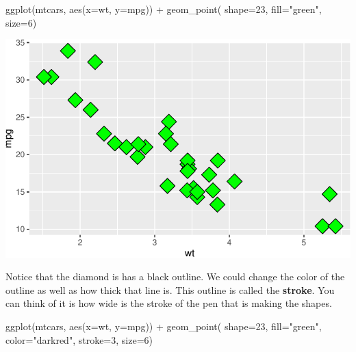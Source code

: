 \documentclass[
  letterpaper,
  DIV=11,
  numbers=noendperiod]{scrreprt}
\newenvironment{Shaded}{\begin{snugshade}}{\end{snugshade}}
\newcommand{\AttributeTok}[1]{\textcolor[rgb]{0.40,0.45,0.13}{#1}}
\newcommand{\DecValTok}[1]{\textcolor[rgb]{0.68,0.00,0.00}{#1}}
\newcommand{\FunctionTok}[1]{\textcolor[rgb]{0.28,0.35,0.67}{#1}}
\newcommand{\NormalTok}[1]{\textcolor[rgb]{0.00,0.23,0.31}{#1}}
\newcommand{\SpecialCharTok}[1]{\textcolor[rgb]{0.37,0.37,0.37}{#1}}
\newcommand{\StringTok}[1]{\textcolor[rgb]{0.13,0.47,0.30}{#1}}
\begin{document}
\begin{Shaded}
\begin{Highlighting}[]
\FunctionTok{ggplot}\NormalTok{(mtcars, }\FunctionTok{aes}\NormalTok{(}\AttributeTok{x=}\NormalTok{wt, }\AttributeTok{y=}\NormalTok{mpg)) }\SpecialCharTok{+}
  \FunctionTok{geom\_point}\NormalTok{( }\AttributeTok{shape=}\DecValTok{23}\NormalTok{, }\AttributeTok{fill=}\StringTok{"green"}\NormalTok{, }\AttributeTok{size=}\DecValTok{6}\NormalTok{)}
\end{Highlighting}
\end{Shaded}

\includegraphics{Advanced_Scatterplot_Techniques_files/figure-pdf/unnamed-chunk-6-1.pdf}

Notice that the diamond is has a black outline. We could change the
color of the outline as well as how thick that line is. This outline is
called the \textbf{stroke}. You can think of it is how wide is the
stroke of the pen that is making the shapes.

\begin{Shaded}
\begin{Highlighting}[]
\FunctionTok{ggplot}\NormalTok{(mtcars, }\FunctionTok{aes}\NormalTok{(}\AttributeTok{x=}\NormalTok{wt, }\AttributeTok{y=}\NormalTok{mpg)) }\SpecialCharTok{+}
  \FunctionTok{geom\_point}\NormalTok{( }\AttributeTok{shape=}\DecValTok{23}\NormalTok{, }\AttributeTok{fill=}\StringTok{"green"}\NormalTok{, }\AttributeTok{color=}\StringTok{"darkred"}\NormalTok{, }\AttributeTok{stroke=}\DecValTok{3}\NormalTok{, }\AttributeTok{size=}\DecValTok{6}\NormalTok{)}
\end{Highlighting}
\end{Shaded}
\end{document}
